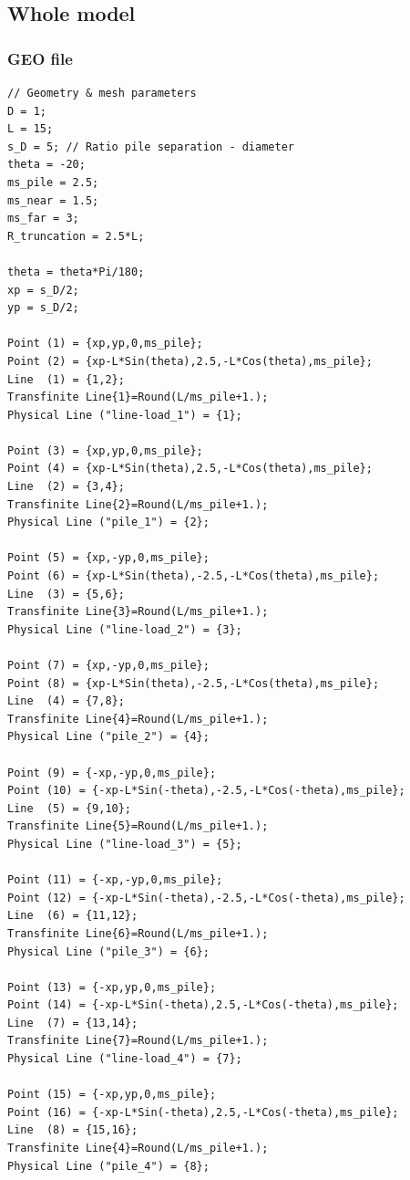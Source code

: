 \documentclass[a4]{article}
\begin{document}
\subsection{Whole model}

\subsubsection{GEO file}

\begin{Verbatim}
// Geometry & mesh parameters
D = 1;
L = 15;
s_D = 5; // Ratio pile separation - diameter
theta = -20;
ms_pile = 2.5;
ms_near = 1.5;
ms_far = 3;
R_truncation = 2.5*L;

theta = theta*Pi/180; 
xp = s_D/2;           
yp = s_D/2;           

Point (1) = {xp,yp,0,ms_pile};
Point (2) = {xp-L*Sin(theta),2.5,-L*Cos(theta),ms_pile};
Line  (1) = {1,2};
Transfinite Line{1}=Round(L/ms_pile+1.);
Physical Line ("line-load_1") = {1};

Point (3) = {xp,yp,0,ms_pile};
Point (4) = {xp-L*Sin(theta),2.5,-L*Cos(theta),ms_pile};
Line  (2) = {3,4};
Transfinite Line{2}=Round(L/ms_pile+1.);
Physical Line ("pile_1") = {2};

Point (5) = {xp,-yp,0,ms_pile};
Point (6) = {xp-L*Sin(theta),-2.5,-L*Cos(theta),ms_pile};
Line  (3) = {5,6};
Transfinite Line{3}=Round(L/ms_pile+1.);
Physical Line ("line-load_2") = {3};

Point (7) = {xp,-yp,0,ms_pile};
Point (8) = {xp-L*Sin(theta),-2.5,-L*Cos(theta),ms_pile};
Line  (4) = {7,8};
Transfinite Line{4}=Round(L/ms_pile+1.);
Physical Line ("pile_2") = {4};

Point (9) = {-xp,-yp,0,ms_pile};
Point (10) = {-xp-L*Sin(-theta),-2.5,-L*Cos(-theta),ms_pile};
Line  (5) = {9,10};
Transfinite Line{5}=Round(L/ms_pile+1.);
Physical Line ("line-load_3") = {5};

Point (11) = {-xp,-yp,0,ms_pile};
Point (12) = {-xp-L*Sin(-theta),-2.5,-L*Cos(-theta),ms_pile};
Line  (6) = {11,12};
Transfinite Line{6}=Round(L/ms_pile+1.);
Physical Line ("pile_3") = {6};

Point (13) = {-xp,yp,0,ms_pile};
Point (14) = {-xp-L*Sin(-theta),2.5,-L*Cos(-theta),ms_pile};
Line  (7) = {13,14};
Transfinite Line{7}=Round(L/ms_pile+1.);
Physical Line ("line-load_4") = {7};

Point (15) = {-xp,yp,0,ms_pile};
Point (16) = {-xp-L*Sin(-theta),2.5,-L*Cos(-theta),ms_pile};
Line  (8) = {15,16};
Transfinite Line{4}=Round(L/ms_pile+1.);
Physical Line ("pile_4") = {8};


\end{Verbatim}
\end{document}
